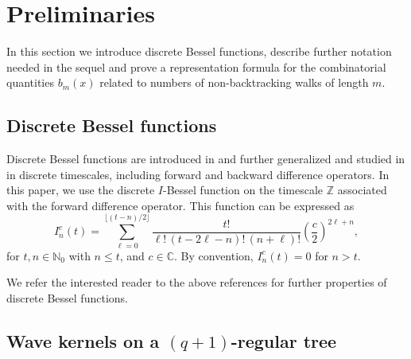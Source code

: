 \documentclass[reqno,10pt]{amsart}
\theoremstyle{definition}
\numberwithin{equation}{section}
\begin{document}
\section{Preliminaries}
In this section we introduce discrete Bessel functions, describe further notation needed in the sequel and prove a representation formula for the combinatorial quantities $b_m(x)$ related to numbers of non-backtracking walks of length $m$. 

\subsection{Discrete Bessel functions }
Discrete Bessel functions are introduced in \cite{BC} and further generalized and studied in \cite{BSS24, CHJSV, Cu15, CS26, KS23, Slav18} in discrete timescales, including forward and backward difference operators.  In this paper, we use the discrete $I$-Bessel function on the timescale $\mathbb Z$ associated with the forward difference operator.
This function can be expressed as
\begin{equation}\label{eq:def-I-Bessel}
I^{c}_{n}(t)
= \sum_{\ell=0}^{\lfloor (t-n)/2\rfloor}
\frac{t!}{\ell!\,(t-2\ell-n)!\,(n+\ell)!}
\left(\frac{c}{2}\right)^{2\ell+n},
\end{equation}
for $t,n\in\mathbb{N}_0$ with $n\le t$, and $c\in\mathbb{C}$. By convention, $I_n^c(t)=0$ for $n>t$.

We refer the interested reader to the above references for further properties of discrete Bessel functions. 

\subsection{Wave kernels on a $(q+1)$-regular tree}
\end{document}
